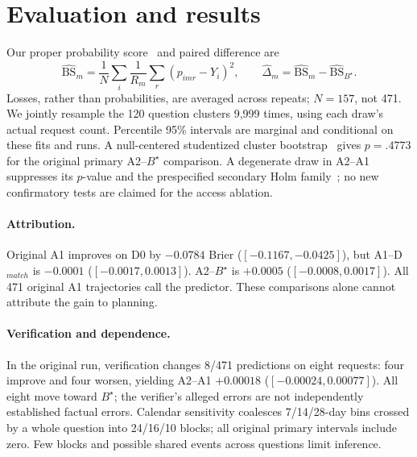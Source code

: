\documentclass[sigconf,anonymous,review]{acmart}
\begin{document}
\section{Evaluation and results}
Our proper probability score~\cite{gneiting2007} and paired difference are
\begin{equation}
\widehat{\mathrm{BS}}_m=\frac1N\sum_i\frac1{R_m}\sum_r(p_{imr}-Y_i)^2,
\qquad\widehat\Delta_m=\widehat{\mathrm{BS}}_m-\widehat{\mathrm{BS}}_{B^\star}.
\end{equation}
Losses, rather than probabilities, are averaged across repeats; $N=157$, not 471. We jointly resample the 120 question clusters 9,999 times, using each draw's actual request count. Percentile 95\% intervals are marginal and conditional on these fits and runs. A null-centered studentized cluster bootstrap~\cite{cameron2015} gives $p=.4773$ for the original primary A2--$B^\star$ comparison. A degenerate draw in A2--A1 suppresses its $p$-value and the prespecified secondary Holm family~\cite{holm1979}; no new confirmatory tests are claimed for the access ablation.

\begin{table}[t]
\caption{Exact test estimates. $N=157$, $G=120$; $R=1$ for $B^\star$, otherwise 3. Paired question-cluster 95\% CIs. Bottom four rows are fresh access-ablation runs; all differences use the same frozen $B^\star$.}
\label{tab:exact}\centering\small

\end{table}

\paragraph{Attribution.}
Original A1 improves on D0 by $-0.0784$ Brier ($[-0.1167,-0.0425]$), but A1--D$_{match}$ is $-0.0001$ ($[-0.0017,0.0013]$). A2--$B^\star$ is $+0.0005$ ($[-0.0008,0.0017]$). All 471 original A1 trajectories call the predictor. These comparisons alone cannot attribute the gain to planning. \AblationFinding{}

\paragraph{Verification and dependence.}
In the original run, verification changes 8/471 predictions on eight requests: four improve and four worsen, yielding A2--A1 $+0.00018$ ($[-0.00024,0.00077]$). All eight move toward $B^\star$; the verifier's alleged errors are not independently established factual errors. \VerificationFinding{} Calendar sensitivity coalesces 7/14/28-day bins crossed by a whole question into 24/16/10 blocks; all original primary intervals include zero. \TemporalFinding{} Few blocks and possible shared events across questions limit inference.
\end{document}
